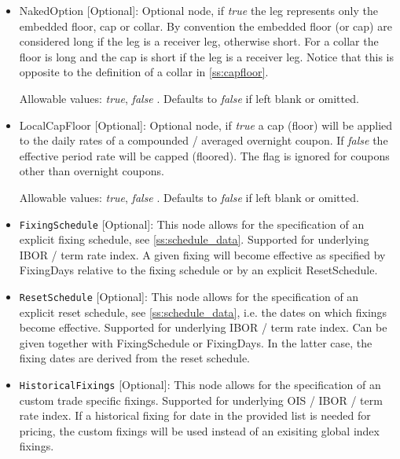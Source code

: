 \begin{itemize}
\item NakedOption [Optional]: Optional node, if \emph{true} the leg represents only the embedded floor, cap or collar.
  By convention the embedded floor (or cap) are considered long if the leg is a receiver leg, otherwise short. For a
  collar the floor is long and the cap is short if the leg is a receiver leg. Notice that this is opposite to
  the definition of a collar in \ref{ss:capfloor}.

 Allowable values: \emph{true}, \emph{false} . Defaults to \emph{false} if left blank or omitted.

\item LocalCapFloor [Optional]: Optional node, if \emph{true} a cap (floor) will be applied to the daily rates of a
  compounded / averaged overnight coupon. If \emph{false} the effective period rate will be capped (floored). The flag
  is ignored for coupons other than overnight coupons.

 Allowable values: \emph{true}, \emph{false} . Defaults to \emph{false} if left blank or omitted.

\item \lstinline!FixingSchedule! [Optional]: This node allows for the specification of an explicit fixing schedule, see
  \ref{ss:schedule_data}. Supported for underlying IBOR / term rate index. A given fixing will become effective as
  specified by FixingDays relative to the fixing schedule or by an explicit ResetSchedule.

\item \lstinline!ResetSchedule! [Optional]: This node allows for the specification of an explicit reset schedule, see
  \ref{ss:schedule_data}, i.e. the dates on which fixings become effective. Supported for underlying IBOR / term rate
  index. Can be given together with FixingSchedule or FixingDays. In the latter case, the fixing dates are derived from
  the reset schedule.

\item \lstinline!HistoricalFixings! [Optional]: This node allows for the specification of an custom trade specific fixings. Supported for underlying OIS / IBOR / term rate
index. If a historical fixing for date in the provided list is needed for pricing,  the custom fixings will be used instead of an exisiting global index fixings.


\end{itemize}

